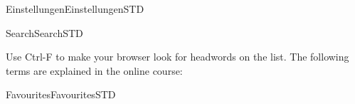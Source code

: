 \begin{MXContent}{Einstellungen}{Einstellungen}{STD}
% 
% 
% 


\end{MXContent}



\begin{MXContent}{Search}{Search}{STD}
\MGlobalSearchTag

Use Ctrl-F to make your browser look for headwords on the list. The following terms are explained in the online course:


\end{MXContent}

\begin{MXContent}{Favourites}{Favourites}{STD}
\MGlobalFavoTag
{}


\end{MXContent}

\fi
